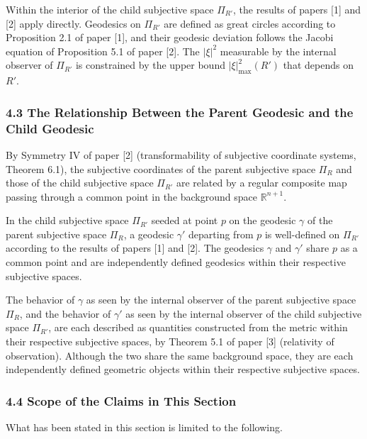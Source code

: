 \documentclass[a4paper,11pt]{article}
\theoremstyle{definition}
\begin{document}
Within the interior of the child subjective space \(\Pi_{R'}\), the results of papers {[}1{]} and {[}2{]} apply directly. Geodesics on \(\Pi_{R'}\) are defined as great circles according to Proposition 2.1 of paper {[}1{]}, and their geodesic deviation follows the Jacobi equation of Proposition 5.1 of paper {[}2{]}. The \(|\xi|^2\) measurable by the internal observer of \(\Pi_{R'}\) is constrained by the upper bound \(|\xi|^2_{\max}(R')\) that depends on \(R'\).

\subsubsection{4.3 The Relationship Between the Parent Geodesic and the Child Geodesic}\label{the-relationship-between-the-parent-geodesic-and-the-child-geodesic}

By Symmetry IV of paper {[}2{]} (transformability of subjective coordinate systems, Theorem 6.1), the subjective coordinates of the parent subjective space \(\Pi_R\) and those of the child subjective space \(\Pi_{R'}\) are related by a regular composite map passing through a common point in the background space \(\mathbb{R}^{n+1}\).

In the child subjective space \(\Pi_{R'}\) seeded at point \(p\) on the geodesic \(\gamma\) of the parent subjective space \(\Pi_R\), a geodesic \(\gamma'\) departing from \(p\) is well-defined on \(\Pi_{R'}\) according to the results of papers {[}1{]} and {[}2{]}. The geodesics \(\gamma\) and \(\gamma'\) share \(p\) as a common point and are independently defined geodesics within their respective subjective spaces.

The behavior of \(\gamma\) as seen by the internal observer of the parent subjective space \(\Pi_R\), and the behavior of \(\gamma'\) as seen by the internal observer of the child subjective space \(\Pi_{R'}\), are each described as quantities constructed from the metric within their respective subjective spaces, by Theorem 5.1 of paper {[}3{]} (relativity of observation). Although the two share the same background space, they are each independently defined geometric objects within their respective subjective spaces.

\subsubsection{4.4 Scope of the Claims in This Section}\label{scope-of-the-claims-in-this-section}

What has been stated in this section is limited to the following.
\end{document}
